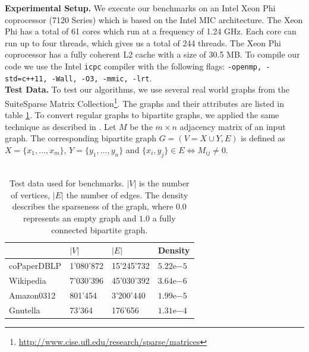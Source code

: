 \documentclass[letterpaper]{article}
\newcommand{\mypar}[1]{{\bf #1.}}
\begin{document}
\mypar{Experimental Setup} 
We execute our benchmarks on an Intel Xeon Phi coprocessor (7120 Series) which is based on the Intel MIC architecture. The Xeon Phi has a total of 61 cores which run at a frequency of 1.24 GHz. Each core can run up to four threads, which gives us a total of 244 threads. The Xeon Phi coprocessor has a fully coherent L2 cache with a size of 30.5 MB. To compile our code we use the Intel \texttt{icpc} compiler with the following flags: \texttt{-openmp, -std=c++11, -Wall, -O3, -mmic, -lrt}.\\


\mypar{Test Data}
To test our algorithms, we use several real world graphs from the SuiteSparse Matrix Collection\footnote{\url{http://www.cise.ufl.edu/research/sparse/matrices}}.
The graphs and their attributes are listed in table \ref{table:testdata}. 
To convert regular graphs to bipartite graphs, we applied the same technique as described in \cite{Azad:2015}. 
Let $M$ be the $m \times n$ adjacency matrix of an input graph. 
The corresponding bipartite graph $G = (V = X \cup Y, E)$ is defined as $X = \{x_1, \dots, x_m\}$, $Y = \{y_1, \dots, y_n\}$ and $\{x_i, y_j\} \in E \iff M_{ij} \neq 0$.\\


\\
\begin{table}
\centering
\begin{tabular}{ |l|l|l|l| }
\hline
 & $\lvert V \rvert$ & $\lvert E \rvert$ & Density \\ \hline
coPaperDBLP & 1'080'872 & 15'245'732 & $5.22\mathrm{e}{-5}$ \\ \hline
Wikipedia & 7'030'396 & 45'030'392 & $3.64\mathrm{e}{-6}$ \\ \hline
Amazon0312 & 801'454 & 3'200'440 & $1.99\mathrm{e}{-5}$ \\ \hline
Gnutella & 73'364 & 176'656 & $1.31\mathrm{e}{-4}$ \\ \hline
\end{tabular}
\caption{Test data used for benchmarks. $\lvert V \rvert$ is the number of vertices, $\lvert E \rvert$ the number of edges. The density describes the sparseness of the graph, where $0.0$ represents an empty graph and $1.0$ a fully connected bipartite graph.}
\label{table:testdata}
\end{table}
\end{document}
